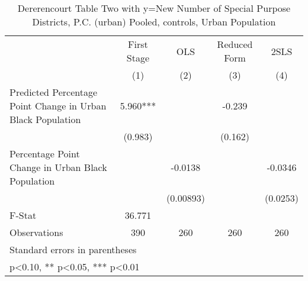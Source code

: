 \begin{table}[htbp]\centering
\def\sym#1{\ifmmode^{#1}\else\(^{#1}\)\fi}
\caption{Dererencourt Table Two with y=New Number of Special Purpose Districts, P.C. (urban)  Pooled,  controls, Urban Population}
\begin{tabular}{l*{4}{c}}
\toprule
                    & First Stage   &         OLS   &Reduced Form   &        2SLS   \\
                    &\multicolumn{1}{c}{(1)}   &\multicolumn{1}{c}{(2)}   &\multicolumn{1}{c}{(3)}   &\multicolumn{1}{c}{(4)}   \\
\midrule
Predicted Percentage Point Change in Urban Black Population&       5.960***&               &      -0.239   &               \\
                    &     (0.983)   &               &     (0.162)   &               \\
\addlinespace
Percentage Point Change in Urban Black Population&               &     -0.0138   &               &     -0.0346   \\
                    &               &   (0.00893)   &               &    (0.0253)   \\
\midrule
F-Stat              &      36.771   &               &               &               \\
Observations        &         390   &         260   &         260   &         260   \\
\bottomrule
\multicolumn{5}{l}{\footnotesize Standard errors in parentheses}\\
\multicolumn{5}{l}{\footnotesize * p<0.10, ** p<0.05, *** p<0.01}\\
\end{tabular}
\end{table}
